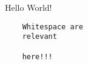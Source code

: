 \documentclass{scrartcl}
\begin{document}
    Hello World!

    \begin{verbatim}
    Whitespace are
    relevant

    here!!!
    \end{verbatim}
\end{document}
